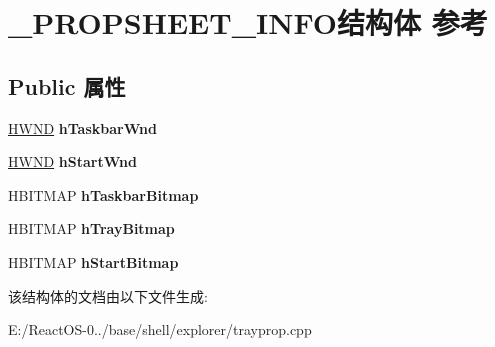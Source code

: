 \hypertarget{struct___p_r_o_p_s_h_e_e_t___i_n_f_o}{}\section{\+\_\+\+P\+R\+O\+P\+S\+H\+E\+E\+T\+\_\+\+I\+N\+F\+O结构体 参考}
\label{struct___p_r_o_p_s_h_e_e_t___i_n_f_o}
\subsection*{Public 属性}
\begin{DoxyCompactItemize}
\item 
\mbox{\label{struct___p_r_o_p_s_h_e_e_t___i_n_f_o_a2d2b3c3b6fde159fca12176863a89f06}} 
\hyperlink{interfacevoid}{H\+W\+ND} {\bfseries h\+Taskbar\+Wnd}
\item 
\mbox{\label{struct___p_r_o_p_s_h_e_e_t___i_n_f_o_ad44d646b1a49002a1cdf30b24373cd55}} 
\hyperlink{interfacevoid}{H\+W\+ND} {\bfseries h\+Start\+Wnd}
\item 
\mbox{\label{struct___p_r_o_p_s_h_e_e_t___i_n_f_o_a5afe039149fe3d4f976ca809cb3ed73c}} 
H\+B\+I\+T\+M\+AP {\bfseries h\+Taskbar\+Bitmap}
\item 
\mbox{\label{struct___p_r_o_p_s_h_e_e_t___i_n_f_o_a737e679b1bf47cae7891baf6475694e3}} 
H\+B\+I\+T\+M\+AP {\bfseries h\+Tray\+Bitmap}
\item 
\mbox{\label{struct___p_r_o_p_s_h_e_e_t___i_n_f_o_a935c023004838c4a4b9646348451d9b1}} 
H\+B\+I\+T\+M\+AP {\bfseries h\+Start\+Bitmap}
\end{DoxyCompactItemize}


该结构体的文档由以下文件生成\+:\begin{DoxyCompactItemize}
\item 
E\+:/\+React\+O\+S-\/0../base/shell/explorer/trayprop.\+cpp\end{DoxyCompactItemize}
